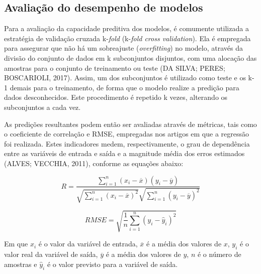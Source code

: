 \subsection{Avaliação do desempenho de modelos}

Para a avaliação da capacidade preditiva dos modelos, é comumente utilizada a estratégia de validação cruzada k-\textit{fold} (k-\textit{fold cross validation}). Ela é empregada para assegurar que não há um sobreajuste (\textit{overfitting}) no modelo, através da divisão do conjunto de dados em k subconjuntos disjuntos, com uma alocação das amostras para o conjunto de treinamento ou teste (DA SILVA; PERES; BOSCARIOLI, 2017). Assim, um dos subconjuntos é utilizado como teste e os k-1 demais para o treinamento, de forma que o modelo realize a predição para dados desconhecidos. Este procedimento é repetido k vezes, alterando os subconjuntos a cada vez.

As predições resultantes podem então ser avaliadas através de métricas, tais como o coeficiente de correlação e RMSE, empregadas nos artigos em que a regressão foi realizada. Estes indicadores medem, respectivamente, o grau de dependência entre as variáveis de entrada e saída e a magnitude média dos erros estimados (ALVES; VECCHIA, 2011), conforme as equações abaixo:

\begin{equation} \label{eq:r}
	R = \frac{\sum_{i=1}^n (x_i - \overline{x})(y_i - \overline{y})}{\sqrt{\sum_{i=1}^n(x_i - \overline{x})^2} \sqrt{\sum_{i=1}^n (y_i - \overline{y})^2}}
\end{equation}

\begin{equation} \label{eq:rmse}
	RMSE = \sqrt{\frac{1}{n} \sum_{i=1}^n (y_i - \hat{y}_i)^2}
\end{equation}

Em que $x_i$ é o valor da variável de entrada, $\overline{x}$ é a média dos valores de $x$, $y_i$ é o valor real da variável de saída, $\overline{y}$ é a média dos valores de $y$, $n$ é o número de amostras e $\hat{y}_i$ é o valor previsto para a variável de saída.



